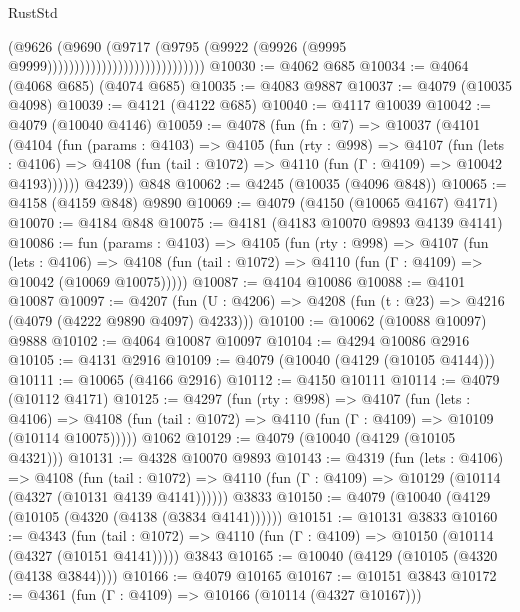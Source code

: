 \begin{lexlean}{RustStd}
\begin{coremodule}
                                                (@9626
                                                  (@9690
                                                    (@9717
                                                      (@9795
                                                        (@9922
                                                          (@9926
                                                            (@9995
                                                              @9999)))))))))))))))))))))))))))))
@10030 := @4062 @685
@10034 := @4064 (@4068 @685) (@4074 @685)
@10035 := @4083 @9887
@10037 := @4079 (@10035 @4098)
@10039 := @4121 (@4122 @685)
@10040 := @4117 @10039
@10042 := @4079 (@10040 @4146)
@10059 := @4078
    (fun (fn : @7) =>
    @10037
      (@4101
        (@4104
          (fun (params : @4103) =>
          @4105
            (fun (rty : @998) =>
            @4107
              (fun (lets : @4106) =>
              @4108 (fun (tail : @1072) => @4110 (fun (Γ : @4109) => @10042 @4193))))))
        @4239))
    @848
@10062 := @4245 (@10035 (@4096 @848))
@10065 := @4158 (@4159 @848) @9890
@10069 := @4079 (@4150 (@10065 @4167) @4171)
@10070 := @4184 @848
@10075 := @4181 (@4183 @10070 @9893 @4139 @4141)
@10086 := fun (params : @4103) =>
  @4105
    (fun (rty : @998) =>
    @4107
      (fun (lets : @4106) =>
      @4108 (fun (tail : @1072) => @4110 (fun (Γ : @4109) => @10042 (@10069 @10075)))))
@10087 := @4104 @10086
@10088 := @4101 @10087
@10097 := @4207
    (fun (U : @4206) => @4208 (fun (t : @23) => @4216 (@4079 (@4222 @9890 @4097) @4233)))
@10100 := @10062 (@10088 @10097) @9888
@10102 := @4064 @10087 @10097
@10104 := @4294 @10086 @2916
@10105 := @4131 @2916
@10109 := @4079 (@10040 (@4129 (@10105 @4144)))
@10111 := @10065 (@4166 @2916)
@10112 := @4150 @10111
@10114 := @4079 (@10112 @4171)
@10125 := @4297
    (fun (rty : @998) =>
    @4107
      (fun (lets : @4106) =>
      @4108 (fun (tail : @1072) => @4110 (fun (Γ : @4109) => @10109 (@10114 @10075)))))
    @1062
@10129 := @4079 (@10040 (@4129 (@10105 @4321)))
@10131 := @4328 @10070 @9893
@10143 := @4319
    (fun (lets : @4106) =>
    @4108
      (fun (tail : @1072) =>
      @4110 (fun (Γ : @4109) => @10129 (@10114 (@4327 (@10131 @4139 @4141))))))
    @3833
@10150 := @4079 (@10040 (@4129 (@10105 (@4320 (@4138 (@3834 @4141))))))
@10151 := @10131 @3833
@10160 := @4343
    (fun (tail : @1072) => @4110 (fun (Γ : @4109) => @10150 (@10114 (@4327 (@10151 @4141)))))
    @3843
@10165 := @10040 (@4129 (@10105 (@4320 (@4138 @3844))))
@10166 := @4079 @10165
@10167 := @10151 @3843
@10172 := @4361 (fun (Γ : @4109) => @10166 (@10114 (@4327 @10167)))

\end{coremodule}
\end{lexlean}
